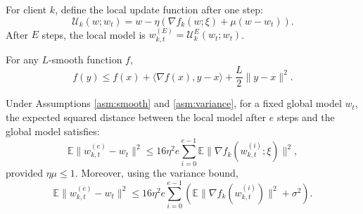 \documentclass{article}
\begin{document}
\begin{definition}
    For client $k$, define the local update function after one step:
    \begin{equation}
        \mathcal{U}_k(w; w_t) = w - \eta \left( \nabla f_k(w; \xi) + \mu (w - w_t) \right).
    \end{equation}
    After $E$ steps, the local model is $w_{k,t}^{(E)} = \mathcal{U}_k^E(w_t; w_t)$.
\end{definition}

\begin{lemma} \label{lem:smooth}
    For any $L$-smooth function $f$,
    \begin{equation}
        f(y) \leq f(x) + \langle \nabla f(x), y-x \rangle + \frac{L}{2} \| y-x \|^2.
    \end{equation}
\end{lemma}

\begin{lemma} \label{lem:drift}
    Under Assumptions \ref{asm:smooth} and \ref{asm:variance}, for a fixed global model $w_t$, the expected squared distance between the local model after $e$ steps and the global model satisfies:
    \begin{equation}
        \mathbb{E} \| w_{k,t}^{(e)} - w_t \|^2 \leq 16 \eta^2 e \sum_{i=0}^{e-1} \mathbb{E} \| \nabla f_k(w_{k,t}^{(i)}; \xi) \|^2,
    \end{equation}
    provided $\eta \mu \leq 1$. Moreover, using the variance bound,
    \begin{equation}
        \mathbb{E} \| w_{k,t}^{(e)} - w_t \|^2 \leq 16 \eta^2 e \sum_{i=0}^{e-1} \left( \mathbb{E} \| \nabla f_k(w_{k,t}^{(i)}) \|^2 + \sigma^2 \right).
    \end{equation}
\end{lemma}
\end{document}
